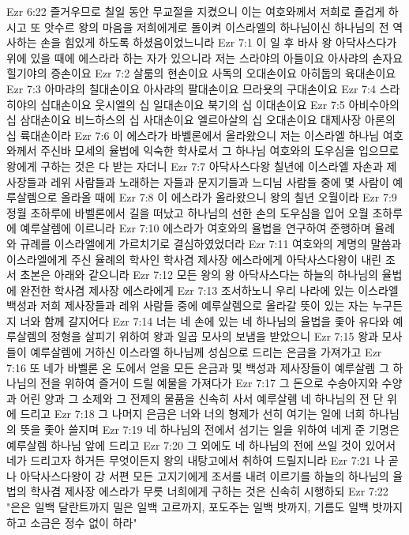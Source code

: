 Ezr 6:22  즐거우므로 칠일 동안 무교절을 지켰으니 이는 여호와께서 저희로 즐겁게 하시고 또 앗수르 왕의 마음을 저희에게로 돌이켜 이스라엘의 하나님이신 하나님의 전 역사하는 손을 힘있게 하도록 하셨음이었느니라
Ezr 7:1  이 일 후 바사 왕 아닥사스다가 위에 있을 때에 에스라라 하는 자가 있으니라 저는 스라야의 아들이요 아사랴의 손자요 힐기야의 증손이요
Ezr 7:2  살룸의 현손이요 사독의 오대손이요 아히둡의 육대손이요
Ezr 7:3  아마랴의 칠대손이요 아사랴의 팔대손이요 므라욧의 구대손이요
Ezr 7:4  스라히야의 십대손이요 웃시엘의 십 일대손이요 북기의 십 이대손이요
Ezr 7:5  아비수아의 십 삼대손이요 비느하스의 십 사대손이요 엘르아살의 십 오대손이요 대제사장 아론의 십 륙대손이라
Ezr 7:6  이 에스라가 바벨론에서 올라왔으니 저는 이스라엘 하나님 여호와께서 주신바 모세의 율법에 익숙한 학사로서 그 하나님 여호와의 도우심을 입으므로 왕에게 구하는 것은 다 받는 자더니
Ezr 7:7  아닥사스다왕 칠년에 이스라엘 자손과 제사장들과 레위 사람들과 노래하는 자들과 문지기들과 느디님 사람들 중에 몇 사람이 예루살렘으로 올라올 때에
Ezr 7:8  이 에스라가 올라왔으니 왕의 칠년 오월이라
Ezr 7:9  정월 초하루에 바벨론에서 길을 떠났고 하나님의 선한 손의 도우심을 입어 오월 초하루에 예루살렘에 이르니라
Ezr 7:10  에스라가 여호와의 율법을 연구하여 준행하며 율례와 규례를 이스라엘에게 가르치기로 결심하였었더라
Ezr 7:11  여호와의 계명의 말씀과 이스라엘에게 주신 율례의 학사인 학사겸 제사장 에스라에게 아닥사스다왕이 내린 조서 초본은 아래와 같으니라
Ezr 7:12  모든 왕의 왕 아닥사스다는 하늘의 하나님의 율법에 완전한 학사겸 제사장 에스라에게
Ezr 7:13  조서하노니 우리 나라에 있는 이스라엘 백성과 저희 제사장들과 레위 사람들 중에 예루살렘으로 올라갈 뜻이 있는 자는 누구든지 너와 함께 갈지어다
Ezr 7:14  너는 네 손에 있는 네 하나님의 율법을 좇아 유다와 예루살렘의 정형을 살피기 위하여 왕과 일곱 모사의 보냄을 받았으니
Ezr 7:15  왕과 모사들이 예루살렘에 거하신 이스라엘 하나님께 성심으로 드리는 은금을 가져가고
Ezr 7:16  또 네가 바벨론 온 도에서 얻을 모든 은금과 및 백성과 제사장들이 예루살렘 그 하나님의 전을 위하여 즐거이 드릴 예물을 가져다가
Ezr 7:17  그 돈으로 수송아지와 수양과 어린 양과 그 소제와 그 전제의 물품을 신속히 사서 예루살렘 네 하나님의 전 단 위에 드리고
Ezr 7:18  그 나머지 은금은 너와 너의 형제가 선히 여기는 일에 너희 하나님의 뜻을 좇아 쓸지며
Ezr 7:19  네 하나님의 전에서 섬기는 일을 위하여 네게 준 기명은 예루살렘 하나님 앞에 드리고
Ezr 7:20  그 외에도 네 하나님의 전에 쓰일 것이 있어서 네가 드리고자 하거든 무엇이든지 왕의 내탕고에서 취하여 드릴지니라
Ezr 7:21  나 곧 나 아닥사스다왕이 강 서편 모든 고지기에게 조서를 내려 이르기를 하늘의 하나님의 율법의 학사겸 제사장 에스라가 무릇 너희에게 구하는 것은 신속히 시행하되
Ezr 7:22  "은은 일백 달란트까지 밀은 일백 고르까지, 포도주는 일백 밧까지, 기름도 일백 밧까지 하고 소금은 정수 없이 하라"
